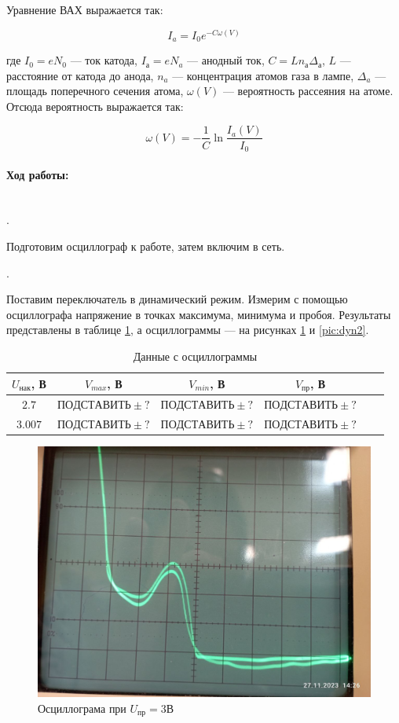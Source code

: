 \documentclass[a4paper, 12pt]{article}
\newcommand{\parag}[1]{\paragraph*{#1:}}
\newcounter{Points}
\newcommand{\point}{\arabic{Points}. \addtocounter{Points}{1}}
\begin{document}
Уравнение ВАХ выражается так:

\begin{equation}
    I_a = I_0 e^{-C \omega(V)}
\end{equation}

где $I_0 = eN_0$ --- ток катода, $I_а = e N_a$ --- анодный ток, $C = L n_а \Delta_а$, $L$ --- расстояние от катода до анода, $n_a$ --- концентрация атомов газа в лампе, $\Delta_a$ --- площадь поперечного сечения атома, $\omega (V)$ --- вероятность рассеяния на атоме. Отсюда вероятность выражается так:

\begin{equation}
    \omega (V) = - \frac{1}{C} \ln \frac{I_a(V)}{I_0}
    \label{eq:prob}
\end{equation}

\parag {Ход работы} ~\\
\point Подготовим осциллограф к работе, затем включим в сеть.

\point Поставим переключатель в динамический режим. Измерим с помощью осциллографа напряжение в точках максимума, минимума и пробоя. Результаты представлены в таблице \ref{tab:dyn}, а осциллограммы --- на рисунках \ref{pic:dyn1} и \ref{pic:dyn2}.

\begin{table}[!h]
    \centering
    \begin{tabular}{|c|c|c|c|c|c|}
        \hline
        $U_{нак}$, В & $V_{max}$, В & $V_{min}$, В & $V_{пр}$, В \\ \hline
        $2.7$ & $ПОДСТАВИТЬ \pm ?$ & $ПОДСТАВИТЬ \pm ?$ & $ПОДСТАВИТЬ \pm ?$ \\ \hline
        $3.007$ & $ПОДСТАВИТЬ \pm ?$ & $ПОДСТАВИТЬ \pm ?$ & $ПОДСТАВИТЬ \pm ?$ \\ \hline
    \end{tabular}
    \caption {Данные с осциллограммы}
    \label{tab:dyn}
\end{table}

\begin{figure}[!h]
    \includegraphics[scale = 0.2]{dyn1.png}
    \centering
    \caption{Осциллограма при $U_{пр} = 3В$}
    \label{pic:dyn1}
\end{figure}
\end{document}
